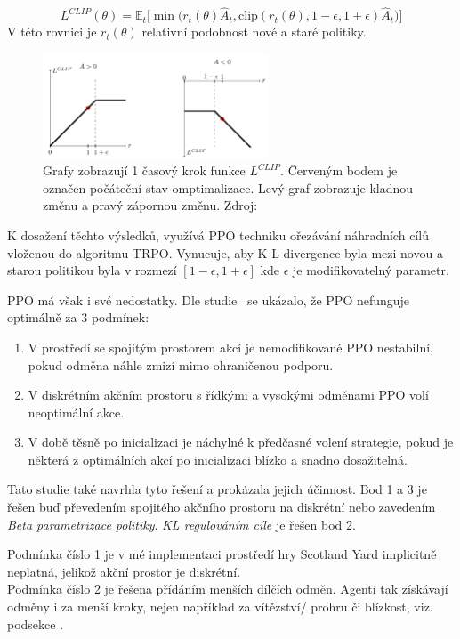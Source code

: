 \begin{equation}
  L^{CLIP}(\theta) = \mathbb{E}_t \Big[ \min \Big( r_t(\theta) \hat{A}_t, \text{clip}(r_t(\theta), 1-\epsilon, 1+\epsilon) \hat{A}_t \Big) \Big]
\end{equation}
V této rovnici je $r_t(\theta)$ relativní podobnost nové a staré politiky.

\begin{figure}[H]
	\centering
	\includegraphics[width=0.6\textwidth]{obrazky-figures/clip.png}
	\caption{Grafy zobrazují 1 časový krok funkce $L^{CLIP}$. Červeným bodem je označen počáteční stav omptimalizace. Levý graf zobrazuje kladnou změnu a pravý zápornou změnu.
  Zdroj: \cite{RL_basics}}\label{fig:markov}
\end{figure}

K dosažení těchto výsledků, využívá PPO techniku ořezávání náhradních cílů vloženou do algoritmu TRPO\@.
Vynucuje, aby K-L divergence byla mezi novou a starou politikou byla v rozmezí $[1-\epsilon, 1+\epsilon]$ kde $\epsilon$ je modifikovatelný parametr.

PPO má však i své nedostatky.
\label{PPO_weakness}
Dle studie~\cite{PPO_weakness} se ukázalo, že PPO nefunguje optimálně za 3 podmínek:
\begin{enumerate}
  \item V prostředí se spojitým prostorem akcí je nemodifikované PPO nestabilní, pokud odměna náhle zmizí mimo ohraničenou podporu.
  \item V diskrétním akčním prostoru s řídkými a vysokými odměnami PPO volí neoptimální akce.
  \item V době těsně po inicializaci je náchylné k předčasné volení strategie, pokud je některá z optimálních akcí po inicializaci blízko a snadno dosažitelná.
\end{enumerate}

Tato studie také navrhla tyto řešení a prokázala jejich účinnost.
Bod 1 a 3 je řešen buď převedením spojitého akčního prostoru na diskrétní nebo zavedením \emph{Beta parametrizace politiky}.
\emph{KL regulováním cíle} je řešen bod 2.

Podmínka číslo 1 je v mé implementaci prostředí hry Scotland Yard implicitně neplatná, jelikož akční prostor je diskrétní.\\
Podmínka číslo 2 je řešena přídáním menších dílčích odměn.
Agenti tak získávají odměny i za menší kroky, nejen například za vítězství/ prohru či blízkost, viz. podsekce .\\
